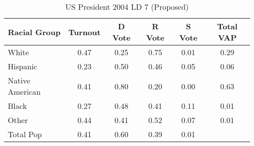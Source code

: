 \begin{table}[htb]
\begin{center}
\caption{US President 2004 LD 7 (Proposed)}
\label{pres04_vap_ld_7}
\begin{tabular}{lccccc}
  \hline
Racial Group & Turnout & D Vote & R Vote & S Vote & Total VAP \\ 
  \hline
White & 0.47 & 0.25 & 0.75 & 0.01 & 0.29 \\ 
  Hispanic & 0.23 & 0.50 & 0.46 & 0.05 & 0.06 \\ 
  Native American & 0.41 & 0.80 & 0.20 & 0.00 & 0.63 \\ 
  Black & 0.27 & 0.48 & 0.41 & 0.11 & 0.01 \\ 
  Other & 0.44 & 0.41 & 0.52 & 0.07 & 0.01 \\ 
  Total Pop & 0.41 & 0.60 & 0.39 & 0.01 &  \\ 
   \hline
\end{tabular}
\end{center}
\end{table}
